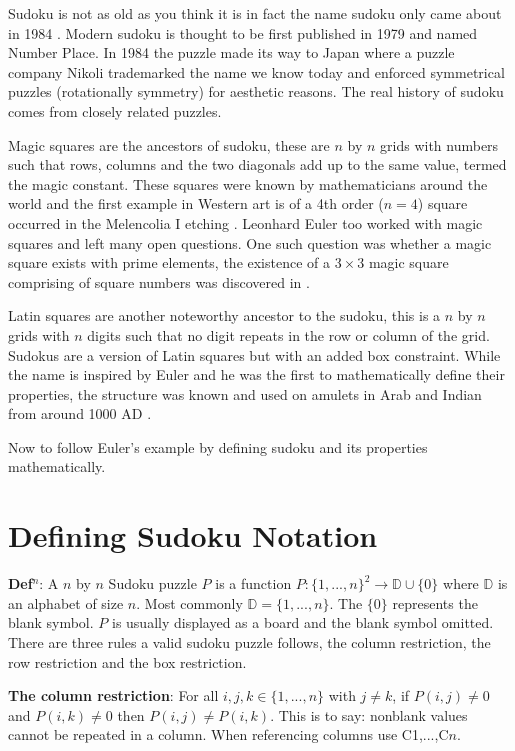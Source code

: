 \documentclass[a4paper,11pt]{report}
\newcounter{row}
\newcounter{col}
\begin{document}
Sudoku is not as old as you think it is in fact the name sudoku only came about in 1984 \cite{Pegg2005}. Modern sudoku is thought to be first published in 1979 and named Number Place. In 1984 the puzzle made its way to Japan where a puzzle company Nikoli trademarked the name we know today and enforced symmetrical puzzles (rotationally symmetry) for aesthetic reasons. The real history of sudoku comes from closely related puzzles.

Magic squares are the ancestors of sudoku, these are $n$ by $n$ grids with numbers such that rows, columns and the two diagonals add up to the same value, termed the magic constant. These squares were known by mathematicians around the world and the first example in Western art is of a 4th order ($n=4$) square occurred in the Melencolia I etching \cite{rigb}. Leonhard Euler too worked with magic squares \cite{euler1779quadratis} and left many open questions. One such question was whether a magic square exists with prime elements, the existence of a $3\times 3$ magic square comprising of square numbers was discovered in \cite{Dudeney1970}.

Latin squares are another noteworthy ancestor to the sudoku, this is a $n$ by $n$ grids with $n$ digits such that no digit repeats in the row or column of the grid. Sudokus are a version of Latin squares but with an added box constraint. While the name is inspired by Euler \cite{andersen2007history} and he was the first to mathematically define their properties, the structure was known and used on amulets in Arab and Indian from around 1000 AD \cite{andersen2007history}. 

Now to follow Euler's example by defining sudoku and its properties mathematically. 
\section{Defining Sudoku Notation}
\textbf{Def$^n$}: A $n$ by $n$ Sudoku puzzle $P$ is a function $P: \{1,...,n\}^2\rightarrow\mathbb D \cup \{0\}$ where $\mathbb D$ is an alphabet of size $n$. Most commonly $\mathbb D = \{1,...,n\}$. The $\{0\}$ represents the blank symbol. $P$ is usually displayed as a board and the blank symbol omitted. There are three rules a valid sudoku puzzle follows, the column restriction, the row restriction and the box restriction.

\textbf{The column restriction}: For all $i,j,k\in \{1,...,n\}$ with $j\neq k$, if $P(i,j)\neq0$ and $P(i,k)\neq0$ then $P(i,j)\neq P(i,k)$. This is to say: nonblank values cannot be repeated in a column. When referencing columns use C1,...,C$n$.
\end{document}
